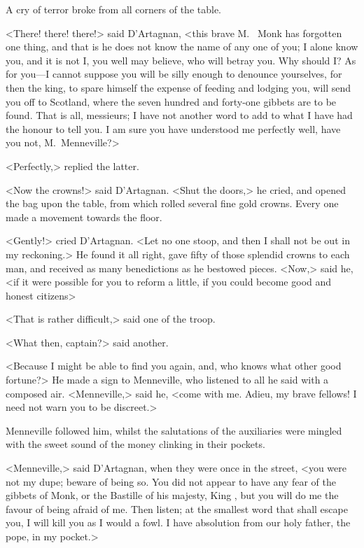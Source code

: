 A cry of terror broke from all corners of the table.

<There! there! there!> said D'Artagnan, <this brave M.~ Monk has forgotten one thing, and that is he does not know the name of any one of you; I alone know you, and it is not I, you well may believe, who will betray you. Why should I\@? As for you—I cannot suppose you will be silly enough to denounce yourselves, for then the king, to spare himself the expense of feeding and lodging you, will send you off to Scotland, where the seven hundred and forty-one gibbets are to be found. That is all, messieurs; I have not another word to add to what I have had the honour to tell you. I am sure you have understood me perfectly well, have you not, M.~Menneville?>

<Perfectly,> replied the latter.

<Now the crowns!> said D'Artagnan. <Shut the doors,> he cried, and opened the bag upon the table, from which rolled several fine gold crowns. Every one made a movement towards the floor.

<Gently!> cried D'Artagnan. <Let no one stoop, and then I shall not be out in my reckoning.> He found it all right, gave fifty of those splendid crowns to each man, and received as many benedictions as he bestowed pieces. <Now,> said he, <if it were possible for you to reform a little, if you could become good and honest citizens\longdash>

<That is rather difficult,> said one of the troop.

<What then, captain?> said another.

<Because I might be able to find you again, and, who knows what other good fortune?> He made a sign to Menneville, who listened to all he said with a composed air. <Menneville,> said he, <come with me. Adieu, my brave fellows! I need not warn you to be discreet.>

Menneville followed him, whilst the salutations of the auxiliaries were mingled with the sweet sound of the money clinking in their pockets.

<Menneville,> said D'Artagnan, when they were once in the street, <you were not my dupe; beware of being so. You did not appear to have any fear of the gibbets of Monk, or the Bastille of his majesty, King , but you will do me the favour of being afraid of me. Then listen; at the smallest word that shall escape you, I will kill you as I would a fowl. I have absolution from our holy father, the pope, in my pocket.>

